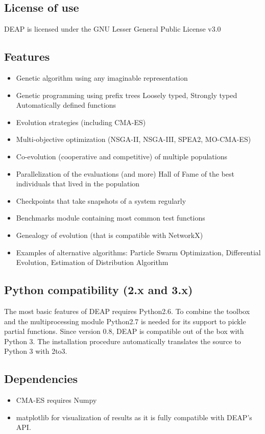 \documentclass{article}
\begin{document}
	\subsection{License of use}
	DEAP is licensed under the
	GNU Lesser General Public License v3.0
	\subsection{Features}
	\begin{itemize}
		\item Genetic algorithm using any imaginable representation
		\item Genetic programming using prefix trees
		\subitem Loosely typed, Strongly typed
		\subitem Automatically defined functions
		\item Evolution strategies (including CMA-ES)
		\item Multi-objective optimization (NSGA-II, NSGA-III, SPEA2, MO-CMA-ES)
		\item Co-evolution (cooperative and competitive) of multiple populations
		\item Parallelization of the evaluations (and more)
		Hall of Fame of the best individuals that lived in the population
		\item Checkpoints that take snapshots of a system regularly
		\item Benchmarks module containing most common test functions
		\item Genealogy of evolution (that is compatible with NetworkX)
		\item Examples of alternative algorithms: Particle Swarm Optimization, Differential Evolution, Estimation of Distribution Algorithm
	\end{itemize}
	\subsection{Python compatibility (2.x and 3.x)}
	The most basic features of DEAP requires Python2.6. To combine the toolbox and the multiprocessing module Python2.7 is needed for its support to pickle partial functions. 
	Since version 0.8, DEAP is compatible out of the box with Python 3. The installation procedure automatically translates the source to Python 3 with 2to3.
	\subsection{Dependencies}
	\begin{itemize}
		\item CMA-ES requires Numpy
		\item matplotlib for visualization of results as it is fully compatible with DEAP's API.
	\end{itemize}
\end{document}
